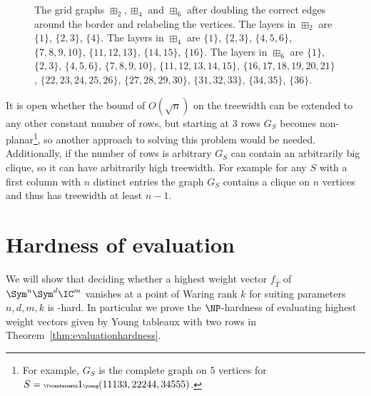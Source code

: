 \begin{figure}[tpb]
    \caption{The grid graphs $\boxplus_{2}, \boxplus_{4}$ and $\boxplus_{6}$ after doubling the correct edges around the border and relabeling the vertices. The layers in $\boxplus_{2}$ are $\{1\}$, $\{2,3\}$, $\{4\}$.
    The layers in $\boxplus_{4}$ are $\{1\}$, $\{2,3\}$, $\{4,5,6\}$, $\{7,8,9,10\}$, $\{11,12,13\}$, $\{14,15\}$, $\{16\}$.
    The layers in $\boxplus_{6}$ are $\{1\}$, $\{2,3\}$, $\{4,5,6\}$, $\{7,8,9,10\}$, $\{11,12,13,14,15\}$, $\{16,17,18,19,20,21\}$, $\{22,23,24,25,26\}$, $\{27,28,29,30\}$, $\{31,32,33\}$, $\{34,35\}$, $\{36\}$.
    }
    \label{fig:regularmultigrid}
\end{figure}

\begin{question}
    It is open whether the bound of $O(\sqrt{n})$ on the treewidth can be extended to any other constant number of rows, but starting at $3$ rows $G_S$ becomes non-planar\footnote{For example, $G_S$ is the complete graph on 5 vertices for $S={\tiny\Yvcentermath1\young(11133,22244,34555)}$.}, so another approach to solving this problem would be needed.
    Additionally, if the number of rows is arbitrary $G_S$ can contain an arbitrarily big clique, so it can have arbitrarily high treewidth.
    For example for any $S$ with a first column with $n$ distinct entries the graph $G_S$ contains a clique on $n$ vertices and thus has treewidth at least $n-1$.
\end{question}


\section{Hardness of evaluation}
\label{sec:hardness}

We will show that deciding whether a highest weight vector $f_{\hat{T}}$ of $\Sym^n\Sym^d \IC^m$ vanishes at a point of Waring rank $k$ for suiting parameters $n, d, m, k$ is \NP-hard.
In particular we prove the $\NP$-hardness of evaluating highest weight vectors given by Young tableaux with two rows in Theorem~\ref{thm:evaluationhardness}.

